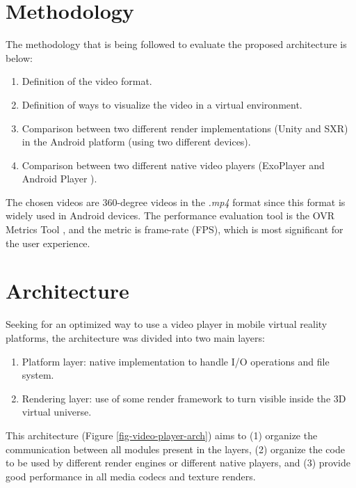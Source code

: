 \documentclass[12pt]{article}
\begin{document}
\section{Methodology}

The methodology that is being followed to evaluate the proposed architecture is below:


\begin{enumerate}
    \item Definition of the video format.
    \item Definition of ways to visualize the video in a virtual environment.
    \item Comparison between two different render implementations (Unity and SXR) in the Android platform (using two different devices).
    \item Comparison between two different native video players (ExoPlayer \cite{Exo} and Android Player \cite{AndroidVideoPlayer}).
\end{enumerate}

The chosen videos are 360-degree videos in the \textit{.mp4} format since this format is widely used in Android devices. The performance evaluation tool is the OVR Metrics Tool \cite{ovrmetrictool}, and the metric is frame-rate (FPS), which is most significant for the user experience.

\section{Architecture}

Seeking for an optimized way to use a video player in mobile virtual reality platforms, the architecture was divided into two main layers:

\begin{enumerate}
    \item Platform layer: native implementation to handle I/O operations and file system.
    \item Rendering layer: use of some render framework to turn visible inside the 3D virtual universe.
\end{enumerate}

This architecture (Figure \ref{fig-video-player-arch}) aims to (1) organize the communication between all modules present in the layers, (2) organize the code to be used by different render engines or different native players, and (3) provide good performance in all media codecs and texture renders. 
\end{document}
